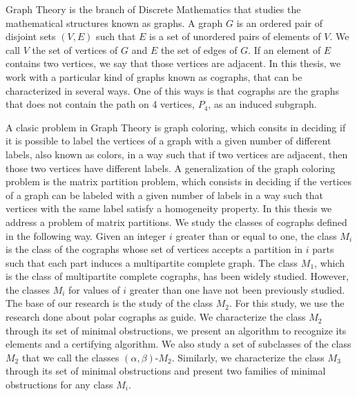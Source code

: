 Graph Theory is the branch of Discrete Mathematics that studies the mathematical structures known as graphs. A graph $G$ is an ordered pair of disjoint sets $(V,E)$ such that $E$ is a set of unordered pairs of elements of $V$. We call $V$ the set of vertices of $G$ and $E$ the set of edges of $G$. If an element of $E$ contains two vertices, we say that those vertices are adjacent. In this thesis, we work with a particular kind of graphs known as cographs, that can be characterized in several ways. One of this ways is that cographs are the graphs that does not contain the path on 4 vertices, $P_4$, as an induced subgraph.

A clasic problem in Graph Theory is graph coloring, which consits in deciding if it is possible to label the vertices of a graph with a given number of different labels, also known as colors, in a way such that if two vertices are adjacent, then those two vertices have different labels. A generalization of the graph coloring problem is the matrix partition problem, which consists in deciding if the vertices of a graph can be labeled with a given number of labels in a way such that vertices with the same label satisfy a homogeneity property. In this thesis we address a problem of matrix partitions. We study the classes of cographs defined in the following way. Given an integer $i$ greater than or equal to one, the class $M_i$ is the class of the cographs whose set of vertices accepts a partition in $i$ parts such that each part induces a multipartite complete graph. The class $M_1$, which is the class of multipartite complete cographs, has been widely studied. However, the classes $M_i$ for values of $i$ greater than one have not been previously studied. The base of our research is the study of the class $M_2$. For this study, we use the research done about polar cographs as guide. We characterize the class $M_2$ through its set of minimal obstructions, we present an algorithm to recognize its elements and a certifying algorithm. We also study a set of subclasses of the class $M_2$ that we call the classes $(\alpha,\beta)$-$M_2$. Similarly, we characterize the class $M_3$ through its set of minimal obstructions and present two families of minimal obstructions for any class $M_i$.
